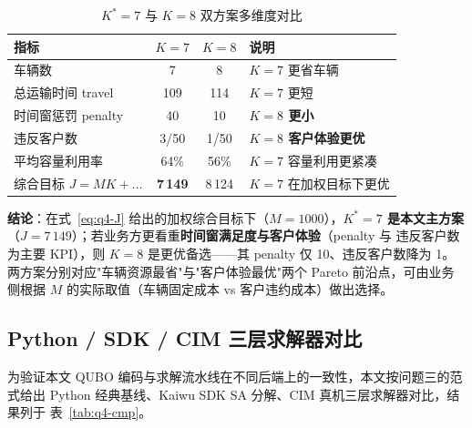 \documentclass[UTF8,12pt,a4paper]{ctexart}
\begin{document}
\begin{table}[H]
    \centering
    \caption{$K^*=7$ 与 $K=8$ 双方案多维度对比}
    \label{tab:q4-k7vsk8}
    \footnotesize
    \begin{tabular}{lcc l}
        \toprule
        指标 & $K=7$ & $K=8$ & 说明 \\
        \midrule
        车辆数                    & 7        & 8        & $K=7$ 更省车辆 \\
        总运输时间 travel         & 109      & 114      & $K=7$ 更短 \\
        时间窗惩罚 penalty        & 40       & 10       & \textbf{$K=8$ 更小} \\
        违反客户数                & 3/50     & 1/50     & \textbf{$K=8$ 客户体验更优} \\
        平均容量利用率            & 64\%     & 56\%     & $K=7$ 容量利用更紧凑 \\
        综合目标 $J=M K+\dots$    & \textbf{7\,149}  & 8\,124   & $K=7$ 在加权目标下更优 \\
        \bottomrule
    \end{tabular}
\end{table}

\textbf{结论}：在式~\eqref{eq:q4-J} 给出的加权综合目标下（$M=1000$），\textbf{$K^*=7$
是本文主方案}（$J=7\,149$）；若业务方更看重\textbf{时间窗满足度与客户体验}（penalty 与
违反客户数为主要 KPI），则 $K=8$ 是更优备选——其 penalty 仅 10、违反客户数降为 1。
两方案分别对应"车辆资源最省"与"客户体验最优"两个 Pareto 前沿点，可由业务侧根据
$M$ 的实际取值（车辆固定成本 vs 客户违约成本）做出选择。

\subsection{Python / SDK / CIM 三层求解器对比}
\label{subsec:q4-cmp}

为验证本文 QUBO 编码与求解流水线在不同后端上的一致性，本文按问题三的范式给出
Python 经典基线、Kaiwu SDK SA 分解、CIM 真机三层求解器对比，结果列于
表~\ref{tab:q4-cmp}。
\end{document}
